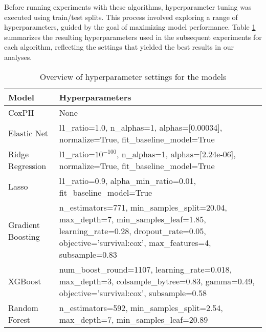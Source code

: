 \documentclass{article}
\begin{document}
Before running experiments with these algorithms, hyperparameter tuning was executed using train/test splits. This process involved exploring a range of hyperparameters, guided by the goal of maximizing model performance. Table \ref{tab:alg_hyperparameters} summarizes the resulting hyperparameters used in the subsequent experiments for each algorithm, reflecting the settings that yielded the best results in our analyses.

\begin{table}[htb]
    \centering
    \caption{Overview of hyperparameter settings for the models}
    \begin{tabularx}{\textwidth}{lX}
    \toprule
    Model & Hyperparameters\\
    \midrule
    CoxPH \cite{tibshirani1997} & None \\
    \addlinespace
    Elastic Net  & l1\_ratio=1.0, n\_alphas=1, alphas=[0.00034], normalize=True, fit\_baseline\_model=True \\
    \addlinespace
    Ridge Regression  & l1\_ratio=$10^{-100}$, n\_alphas=1, alphas=[2.24e-06], normalize=True, fit\_baseline\_model=True \\
    \addlinespace
    Lasso  & l1\_ratio=0.9, alpha\_min\_ratio=0.01, fit\_baseline\_model=True \\
    \addlinespace
    Gradient Boosting  & n\_estimators=771, min\_samples\_split=20.04, max\_depth=7, min\_samples\_leaf=1.85, learning\_rate=0.28, dropout\_rate=0.05, objective='survival:cox', max\_features=4, subsample=0.83 \\
    \addlinespace
    XGBoost  & num\_boost\_round=1107, learning\_rate=0.018, max\_depth=3, colsample\_bytree=0.83, gamma=0.49, objective='survival:cox', subsample=0.58 \\
    \addlinespace
    Random Forest  & n\_estimators=592, min\_samples\_split=2.54, max\_depth=7, min\_samples\_leaf=20.89 \\
    \bottomrule
    \end{tabularx}
    \label{tab:alg_hyperparameters}
\end{table}
\end{document}
